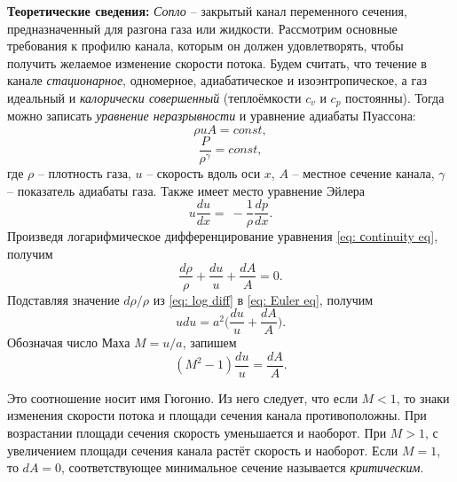 \documentclass[a4paper,12pt]{article}
\begin{document}
\textbf{Теоретические сведения:} 
\textit{Сопло} -- закрытый канал переменного сечения, предназначенный для разгона газа или жидкости. Рассмотрим основные требования к профилю канала, которым он должен удовлетворять, чтобы получить желаемое изменение скорости потока. Будем считать, что течение в канале \textit{стационарное}, одномерное, адиабатическое и изоэнтропическое, а газ идеальный и \textit{калорически совершенный} (теплоёмкости $c_v $ и $c_p$ постоянны). Тогда можно записать \textit{уравнение неразрывности} и уравнение адиабаты Пуассона:
\begin{equation}\label{eq: сontinuity eq}
    \rho u A = const,
\end{equation}
\begin{equation}\label{eq: сontinuity eq}
    \frac{P}{\rho^{\gamma}} = const,
\end{equation}
где $\rho$ -- плотность газа, $u$ -- скорость вдоль оси $x$, $A$ -- местное сечение канала, $\gamma$ -- показатель адиабаты газа. Также имеет место уравнение Эйлера
\begin{equation}\label{eq: Euler eq}
    u \frac{du}{dx} = \ - \frac{1}{\rho} \frac{dp}{dx}.  
\end{equation}
Произведя логарифмическое дифференцирование уравнения \eqref{eq: сontinuity eq}, получим
\begin{equation}\label{eq: log diff}
    \frac{d\rho}{\rho} + \frac{du}{u} + \frac{dA}{A} = 0.
\end{equation}
Подставляя значение $d\rho / \rho$ из \eqref{eq: log diff} в \eqref{eq: Euler eq}, получим 
\begin{equation}
    u du = a^2 \bigg(\frac{du}{u} + \frac{dA}{A}\bigg).
\end{equation}
Обозначая число Маха $M = u / a$, запишем 
\begin{equation}\label{eq: Gugonio eq}
    (M^2 - 1) \frac{du}{u} = \frac{dA}{A}.
\end{equation}

Это соотношение носит имя Гюгонио. Из него следует, что если $M < 1$, то знаки изменения скорости потока и площади сечения канала противоположны. При возрастании площади сечения скорость уменьшается и наоборот. При $M > 1$, с увеличением площади сечения канала растёт скорость и наоборот. Если $M = 1$, то $dA = 0$, соответствующее минимальное сечение называется \textit{критическим}. 
\end{document}
